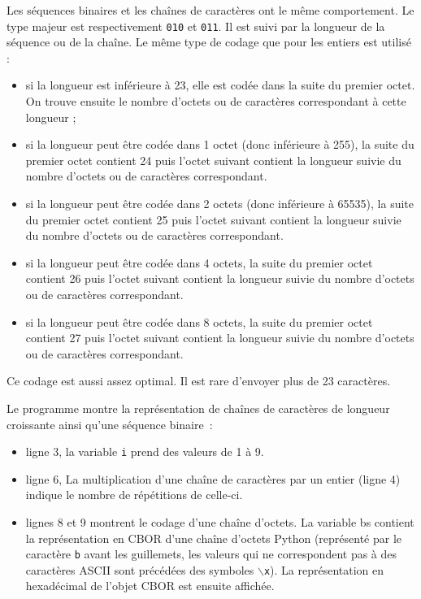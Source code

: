 Les séquences binaires et les chaînes de caractères ont le même comportement. Le type majeur est respectivement \texttt{010} et \texttt{011}. Il est suivi par la longueur de la séquence ou de la chaîne. Le même type de codage que pour les entiers est utilisé :
\begin{itemize}
    \item si la longueur est inférieure à 23, elle est codée dans la suite du premier octet. On trouve ensuite le nombre d'octets ou de caractères correspondant à cette longueur ;
    \item si la longueur peut être codée dans 1 octet (donc inférieure à 255), la suite du premier octet contient 24 puis l'octet suivant contient la longueur suivie du nombre d'octets ou de caractères correspondant.
    \item si la longueur peut être codée dans 2 octets (donc inférieure à 65535), la suite du premier octet contient 25 puis l'octet suivant contient la longueur suivie du nombre d'octets ou de caractères correspondant.
    \item si la longueur peut être codée dans 4 octets, la suite du premier octet contient 26 puis l'octet suivant contient la longueur suivie du nombre d'octets ou de caractères correspondant.
    \item si la longueur peut être codée dans 8 octets, la suite du premier octet contient 27 puis l'octet suivant contient la longueur suivie du nombre d'octets ou de caractères correspondant.
\end{itemize}

       \vspace{1em}

Ce codage est aussi assez optimal. Il est rare d'envoyer plus de 23 caractères.


Le programme  montre la représentation de chaînes de caractères de longueur croissante ainsi qu'une séquence binaire~:

\begin{itemize}
    \item ligne 3, la variable \texttt{i} prend des valeurs de 1 à 9.
    \item ligne 6, La multiplication d'une chaîne de caractères par un entier (ligne 4) indique le nombre de répétitions de celle-ci.
    \item lignes 8 et 9 montrent le codage d'une chaîne d'octets. La variable bs contient la représentation en CBOR d'une chaîne d'octets Python (représenté par le caractère \texttt{b} avant les guillemets, les valeurs qui ne correspondent pas à des caractères ASCII sont précédées des symboles \texttt{$\backslash$x}). La représentation en hexadécimal de l'objet CBOR est ensuite affichée.
\end{itemize}

